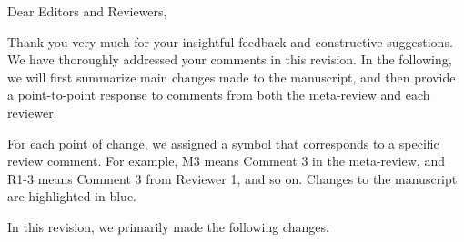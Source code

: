 \noindent Dear Editors and Reviewers,
\bigskip

Thank you very much for your insightful feedback and constructive suggestions. We have thoroughly addressed your comments %
in this revision. %
In the following, we will first summarize main changes made to the manuscript, and then  provide a point-to-point response to comments from both the meta-review and each reviewer.

For each point of change, we assigned a symbol that corresponds to a specific review comment. For example, M3 means Comment 3 in the meta-review, and R1-3 means Comment 3 from Reviewer 1, and so on.
Changes to the manuscript are highlighted in blue.

\bigskip
In this revision, we primarily made the following changes. 

